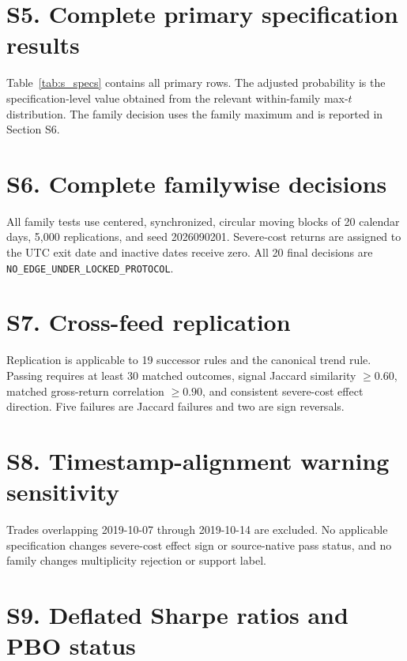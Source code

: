 \documentclass[a4paper,fleqn]{cas-sc}
\begin{document}
\section*{S5. Complete primary specification results}

Table~\ref{tab:s_specs} contains all primary rows. The adjusted probability is the specification-level value obtained from the relevant within-family max-$t$ distribution. The family decision uses the family maximum and is reported in Section S6.



\section*{S6. Complete familywise decisions}

All family tests use centered, synchronized, circular moving blocks of 20 calendar days, 5,000 replications, and seed 2026090201. Severe-cost returns are assigned to the UTC exit date and inactive dates receive zero. All 20 final decisions are \texttt{NO\_EDGE\_UNDER\_LOCKED\_PROTOCOL}.



\section*{S7. Cross-feed replication}

Replication is applicable to 19 successor rules and the canonical trend rule. Passing requires at least 30 matched outcomes, signal Jaccard similarity $\ge0.60$, matched gross-return correlation $\ge0.90$, and consistent severe-cost effect direction. Five failures are Jaccard failures and two are sign reversals.



\section*{S8. Timestamp-alignment warning sensitivity}

Trades overlapping 2019-10-07 through 2019-10-14 are excluded. No applicable specification changes severe-cost effect sign or source-native pass status, and no family changes multiplicity rejection or support label.



\section*{S9. Deflated Sharpe ratios and PBO status}
\end{document}
